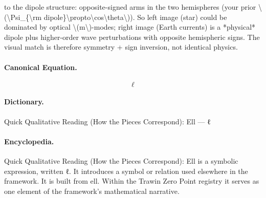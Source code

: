 to the dipole structure: opposite-signed arms in the two hemispheres (your prior \textbackslash{}(\textbackslash{}Psi\_\{\textbackslash{}rm dipole\}\textbackslash{}propto\textbackslash{}cos\textbackslash{}theta\textbackslash{})). So left image (star) could be dominated by optical \textbackslash{}(m\textbackslash{})-modes; right image (Earth currents) is a *physical* dipole plus higher-order wave perturbations with opposite hemispheric signs. The visual match is therefore symmetry + sign inversion, not identical physics.

\paragraph{Canonical Equation.}
\[
\ell
\]

\paragraph{Dictionary.}
Quick Qualitative Reading (How the Pieces Correspond): Ell — ℓ

\paragraph{Encyclopedia.}
Quick Qualitative Reading (How the Pieces Correspond): Ell is a symbolic expression, written ℓ. It introduces a symbol or relation used elsewhere in the framework. It is built from ell. Within the Trawin Zero Point registry it serves as one element of the framework's mathematical narrative.
